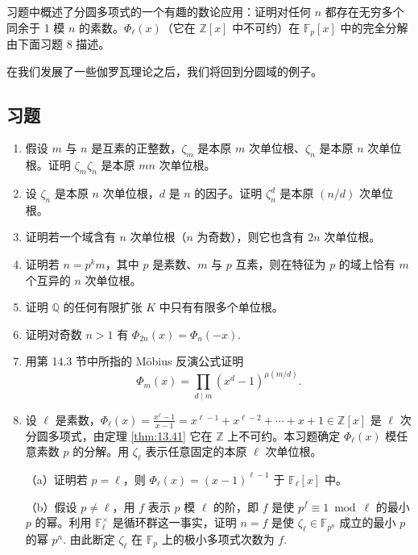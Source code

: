 习题中概述了分圆多项式的一个有趣的数论应用：证明对任何 \(n\) 都存在无穷多个同余于 1 模 \(n\) 的素数。\(\Phi_\ell(x)\)（它在 \(\mathbb{Z}[x]\) 中不可约）在 \(\mathbb{F}_p[x]\) 中的完全分解由下面习题 8 描述。

在我们发展了一些伽罗瓦理论之后，我们将回到分圆域的例子。

\subsection*{习题}

\begin{enumerate}
\item 假设 \(m\) 与 \(n\) 是互素的正整数，\(\zeta_m\) 是本原 \(m\) 次单位根、\(\zeta_n\) 是本原 \(n\) 次单位根。证明 \(\zeta_m\zeta_n\) 是本原 \(mn\) 次单位根。

\item 设 \(\zeta_n\) 是本原 \(n\) 次单位根，\(d\) 是 \(n\) 的因子。证明 \(\zeta_n^d\) 是本原 \((n/d)\) 次单位根。

\item 证明若一个域含有 \(n\) 次单位根（\(n\) 为奇数），则它也含有 \(2n\) 次单位根。

\item 证明若 \(n = p^km\)，其中 \(p\) 是素数、\(m\) 与 \(p\) 互素，则在特征为 \(p\) 的域上恰有 \(m\) 个互异的 \(n\) 次单位根。

\item 证明 \(\mathbb{Q}\) 的任何有限扩张 \(K\) 中只有有限多个单位根。

\item 证明对奇数 \(n > 1\) 有 \(\Phi_{2n}(x) = \Phi_n(-x)\).

\item 用第 14.3 节中所指的 Möbius 反演公式证明
\[
\Phi_m(x) = \prod_{d \mid m}(x^d-1)^{\mu(m/d)}.
\]

\item 设 \(\ell\) 是素数，\(\Phi_\ell(x) = \frac{x^\ell-1}{x-1} = x^{\ell-1}+x^{\ell-2}+\cdots+x+1 \in \mathbb{Z}[x]\) 是 \(\ell\) 次分圆多项式，由定理 \ref{thm:13.41} 它在 \(\mathbb{Z}\) 上不可约。本习题确定 \(\Phi_\ell(x)\) 模任意素数 \(p\) 的分解。用 \(\zeta_\ell\) 表示任意固定的本原 \(\ell\) 次单位根。

（a）证明若 \(p = \ell\)，则 \(\Phi_\ell(x) = (x-1)^{\ell-1}\) 于 \(\mathbb{F}_\ell[x]\) 中。

（b）假设 \(p \neq \ell\)，用 \(f\) 表示 \(p\) 模 \(\ell\) 的阶，即 \(f\) 是使 \(p^f \equiv 1 \bmod \ell\) 的最小 \(p\) 的幂。利用 \(\mathbb{F}_\ell^\times\) 是循环群这一事实，证明 \(n = f\) 是使 \(\zeta_\ell \in \mathbb{F}_{p^n}\) 成立的最小 \(p\) 的幂 \(p^n\). 由此断定 \(\zeta_\ell\) 在 \(\mathbb{F}_p\) 上的极小多项式次数为 \(f\).


\end{enumerate}
